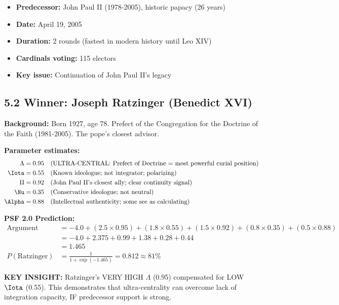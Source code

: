 \begin{itemize}
\item \textbf{Predecessor:} John Paul II (1978-2005), historic papacy (26 years)
\item \textbf{Date:} April 19, 2005
\item \textbf{Duration:} 2 rounds (fastest in modern history until Leo XIV)
\item \textbf{Cardinals voting:} 115 electors
\item \textbf{Key issue:} Continuation of John Paul II's legacy
\end{itemize}

\subsection{5.2 Winner: Joseph Ratzinger (Benedict XVI)}

\textbf{Background:} Born 1927, age 78. Prefect of the Congregation for the Doctrine of the Faith (1981-2005). The pope's closest advisor.

\textbf{Parameter estimates:}
\begin{align*}
\Lambda &= 0.95 \quad \text{(ULTRA-CENTRAL: Prefect of Doctrine = most powerful curial position)} \\
\Iota &= 0.55 \quad \text{(Known ideologue; not integrator; polarizing)} \\
\Pi &= 0.92 \quad \text{(John Paul II's closest ally; clear continuity signal)} \\
\Nu &= 0.35 \quad \text{(Conservative ideologue; not neutral)} \\
\Alpha &= 0.88 \quad \text{(Intellectual authenticity; some see as calculating)}
\end{align*}

\textbf{PSF 2.0 Prediction:}
\begin{align*}
\text{Argument} &= -4.0 + (2.5 \times 0.95) + (1.8 \times 0.55) + (1.5 \times 0.92) + (0.8 \times 0.35) + (0.5 \times 0.88) \\
&= -4.0 + 2.375 + 0.99 + 1.38 + 0.28 + 0.44 \\
&= 1.465 \\
P(\text{Ratzinger}) &= \frac{1}{1 + \exp(-1.465)} = 0.812 \approx 81\%
\end{align*}

\textbf{KEY INSIGHT:} Ratzinger's VERY HIGH $\Lambda$ (0.95) compensated for LOW $\Iota$ (0.55). This demonstrates that ultra-centrality can overcome lack of integration capacity, IF predecessor support is strong.

